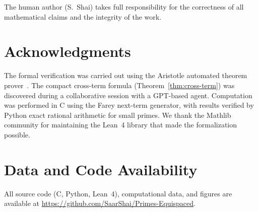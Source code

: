 \documentclass[11pt]{article}
\theoremstyle{definition}
\begin{document}
\noindent The human author (S.~Shai) takes full responsibility for the
correctness of all mathematical claims and the integrity of the work.

\section*{Acknowledgments}

The formal verification was carried out using the Aristotle
automated theorem prover~\cite{Aristotle2025}.  The compact
cross-term formula (Theorem~\ref{thm:cross-term}) was discovered
during a collaborative session with a GPT-based agent.
Computation was performed in C using the Farey next-term
generator, with results verified by Python exact rational
arithmetic for small primes.  We thank the Mathlib community
for maintaining the Lean~4 library that made the formalization
possible.


\section*{Data and Code Availability}

All source code (C, Python, Lean~4), computational data, and
figures are available at
\url{https://github.com/SaarShai/Primes-Equispaced}.

\end{document}
